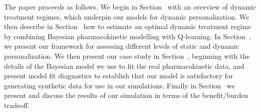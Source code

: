 The paper proceeds as follows. We begin in Section~\label{ss:dtrs} with an overview of dynamic treatment regimes, which underpin our models for dynamic personalization.  We then describe in Section~\label{ss:optimal} how to estimate an optimal dynamic treatment regime by combining Bayesian pharmacokinetic modelling with Q-learning. In Section~\label{ss:framework}, we present our framework for assessing different levels of static and dynamic personalization.  We then present our case study in Section~\label{ss:casestudy}, beginning with the details of the Bayesian model we use to fit the real pharmacokinetic data, and present model fit diagnostics to establish that our model is satisfactory for generating synthetic data for use in our simulations. Finally in Section~\label{ss:} we present and discuss the results of our simulation in terms of the benefit/burden tradeoff.

